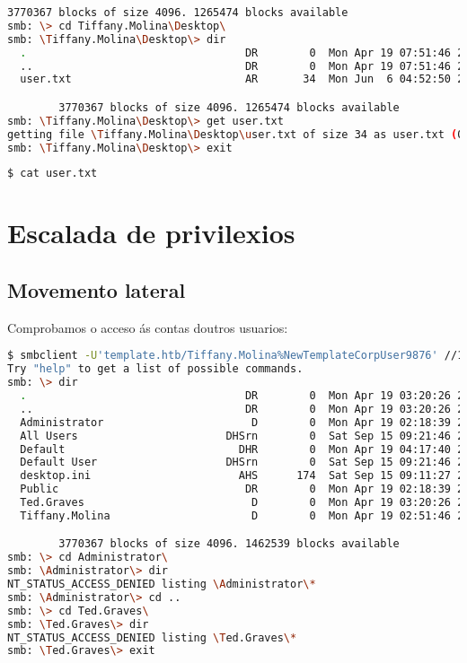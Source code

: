 \documentclass[a4paper]{article}
\begin{document}
\begin{lstlisting}[language=Bash, caption=Recursos compartidos, linewidth=18.7cm]
		3770367 blocks of size 4096. 1265474 blocks available
smb: \> cd Tiffany.Molina\Desktop\
smb: \Tiffany.Molina\Desktop\> dir
  .                                  DR        0  Mon Apr 19 07:51:46 2021
  ..                                 DR        0  Mon Apr 19 07:51:46 2021
  user.txt                           AR       34  Mon Jun  6 04:52:50 2022

		3770367 blocks of size 4096. 1265474 blocks available
smb: \Tiffany.Molina\Desktop\> get user.txt
getting file \Tiffany.Molina\Desktop\user.txt of size 34 as user.txt (0,2 KiloBytes/sec) (average 0,2 KiloBytes/sec)
smb: \Tiffany.Molina\Desktop\> exit\end{lstlisting}

        \begin{lstlisting}[language=Bash, caption=Flag user.txt]
$ cat user.txt\end{lstlisting}

        \clearpage
        \section{Escalada de privilexios}
        \vspace{0.2cm}
        \subsection{Movemento lateral}
        Comprobamos o acceso ás contas doutros usuarios:
        \begin{lstlisting}[language=Bash, caption=Outros usuarios existentes no sistema]
$ smbclient -U'template.htb/Tiffany.Molina%NewTemplateCorpUser9876' //10.10.10.248/Users
Try "help" to get a list of possible commands.
smb: \> dir
  .                                  DR        0  Mon Apr 19 03:20:26 2021
  ..                                 DR        0  Mon Apr 19 03:20:26 2021
  Administrator                       D        0  Mon Apr 19 02:18:39 2021
  All Users                       DHSrn        0  Sat Sep 15 09:21:46 2018
  Default                           DHR        0  Mon Apr 19 04:17:40 2021
  Default User                    DHSrn        0  Sat Sep 15 09:21:46 2018
  desktop.ini                       AHS      174  Sat Sep 15 09:11:27 2018
  Public                             DR        0  Mon Apr 19 02:18:39 2021
  Ted.Graves                          D        0  Mon Apr 19 03:20:26 2021
  Tiffany.Molina                      D        0  Mon Apr 19 02:51:46 2021

		3770367 blocks of size 4096. 1462539 blocks available
smb: \> cd Administrator\
smb: \Administrator\> dir
NT_STATUS_ACCESS_DENIED listing \Administrator\*
smb: \Administrator\> cd ..
smb: \> cd Ted.Graves\
smb: \Ted.Graves\> dir
NT_STATUS_ACCESS_DENIED listing \Ted.Graves\*
smb: \Ted.Graves\> exit\end{lstlisting}
\end{document}

